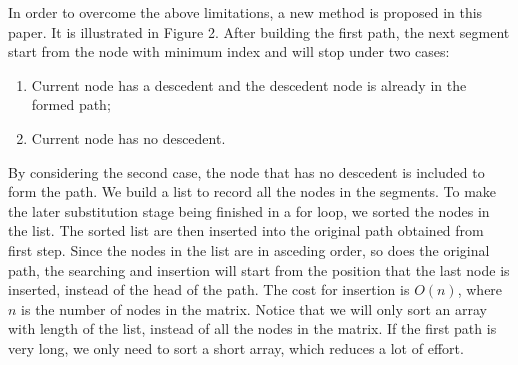 In order to overcome the above limitations, a new method is proposed in this paper. It is illustrated in Figure 2.
After building the first path, the next segment start from the node with minimum index and will stop under two cases: 
\begin{enumerate}[1)]
\item Current node has a descedent and the descedent node is already in the formed path; 
\item Current node has no descedent.
\end{enumerate} 
By considering the second case, the node that has no descedent is included to form the path. We build a list to record all the nodes in 
the segments. To make the later substitution stage being finished in a for loop, we sorted the nodes in the list. The sorted list are then
inserted into the original path obtained from first step. Since the nodes in the list are in asceding order, so does the original path, 
the searching and insertion will start from the position that the last node is inserted, instead of the head of the path. The cost for
insertion is $O(n)$, where $n$ is the number of nodes in the matrix. Notice that we will only sort an array with length of the list, 
instead of all the nodes in the matrix. If the first path is very long, we only need to sort a short array, which reduces a lot of effort.


